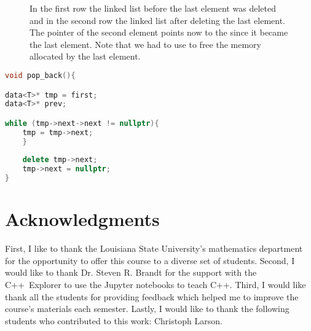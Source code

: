 \documentclass[11pt,fleqn]{book} %
\begin{document}
\begin{figure}[h]
\centering
{}
\caption{In the first row the linked list before the last element was deleted and in the second row the linked list after deleting the last element. The pointer  of the second element points now to the  since it became the last element. Note that we had to use  to free the memory allocated by the last element.}
\label{fig:sketch:linked:remove last}
\end{figure}


\begin{lstlisting}[language=c++,caption={Implementation of the \cpp{pop_back} function of a linked list.\label{code:list:pop_back}},float,floatplacement=tb]
void pop_back(){

data<T>* tmp = first;
data<T>* prev;

while (tmp->next->next != nullptr){
    tmp = tmp->next;
    }
    
    delete tmp->next;
    tmp->next = nullptr;
}
\end{lstlisting}

\part{Acknowledgments}

First, I like to thank the Louisiana State University's mathematics department for the opportunity to offer this course to a diverse set of students. Second, I would like to thank Dr. Steven R. Brandt for the support with the C++\ Explorer to use the Jupyter notebooks to teach C++. Third, I would like thank all the students for providing feedback which helped me to improve the course's materials each semester. Lastly, I would like to thank the following students who contributed to this work: Christoph Larson.
\end{document}

